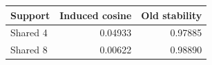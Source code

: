 \begin{tabular}{lrr}
\toprule
Support & Induced cosine & Old stability \\
\midrule
Shared 4 & 0.04933 & 0.97885 \\
Shared 8 & 0.00622 & 0.98890 \\
\bottomrule
\end{tabular}
